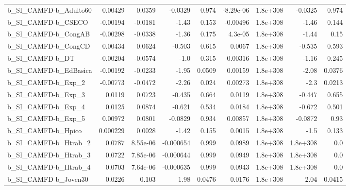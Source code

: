 \begin{tabular}{lrrrrrrrr}
b\_SI\_CAMFD-b\_Adulto60        &     0.00429 &       0.0359 &   -0.0329 &    0.974 &  -8.29e-06 &    1.8e+308 &      -0.0325 &         0.974 \\
b\_SI\_CAMFD-b\_CSECO           &    -0.00194 &      -0.0181 &     -1.43 &    0.153 &   -0.00496 &    1.8e+308 &        -1.46 &         0.144 \\
b\_SI\_CAMFD-b\_CongAB          &    -0.00298 &      -0.0338 &     -1.36 &    0.175 &    4.3e-05 &    1.8e+308 &        -1.44 &          0.15 \\
b\_SI\_CAMFD-b\_CongCD          &     0.00434 &       0.0624 &    -0.503 &    0.615 &     0.0067 &    1.8e+308 &       -0.535 &         0.593 \\
b\_SI\_CAMFD-b\_DT              &    -0.00204 &      -0.0574 &      -1.0 &    0.315 &    0.00316 &    1.8e+308 &        -1.16 &         0.245 \\
b\_SI\_CAMFD-b\_EdBasica        &    -0.00192 &      -0.0233 &     -1.95 &   0.0509 &    0.00159 &    1.8e+308 &        -2.08 &        0.0376 \\
b\_SI\_CAMFD-b\_Exp\_2           &    -0.00773 &      -0.0472 &     -2.26 &    0.024 &    0.00273 &    1.8e+308 &         -2.3 &        0.0213 \\
b\_SI\_CAMFD-b\_Exp\_3           &      0.0119 &       0.0723 &    -0.435 &    0.664 &     0.0119 &    1.8e+308 &       -0.447 &         0.655 \\
b\_SI\_CAMFD-b\_Exp\_4           &      0.0125 &       0.0874 &    -0.621 &    0.534 &     0.0184 &    1.8e+308 &       -0.672 &         0.501 \\
b\_SI\_CAMFD-b\_Exp\_5           &     0.00972 &       0.0801 &   -0.0829 &    0.934 &    0.00857 &    1.8e+308 &      -0.0872 &          0.93 \\
b\_SI\_CAMFD-b\_Hpico           &    0.000229 &       0.0028 &     -1.42 &    0.155 &     0.0015 &    1.8e+308 &         -1.5 &         0.133 \\
b\_SI\_CAMFD-b\_Htrab\_2         &      0.0787 &     8.55e-06 & -0.000654 &    0.999 &     0.0989 &    1.8e+308 &     1.8e+308 &           0.0 \\
b\_SI\_CAMFD-b\_Htrab\_3         &      0.0722 &     7.85e-06 & -0.000644 &    0.999 &     0.0949 &    1.8e+308 &     1.8e+308 &           0.0 \\
b\_SI\_CAMFD-b\_Htrab\_4         &      0.0703 &     7.64e-06 & -0.000635 &    0.999 &     0.0943 &    1.8e+308 &     1.8e+308 &           0.0 \\
b\_SI\_CAMFD-b\_Joven30         &      0.0226 &        0.103 &      1.98 &   0.0476 &     0.0176 &    1.8e+308 &         2.04 &        0.0415 \\

\end{tabular}
